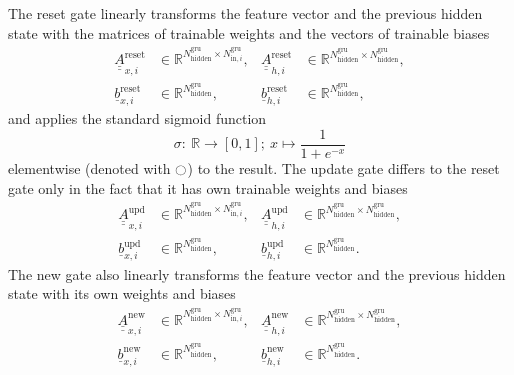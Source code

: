 The reset gate linearly transforms the feature vector and the previous hidden state
with the matrices of trainable weights and the vectors of trainable biases
\begin{align}
    \underline{\underline A}^\text{reset}_{x,i}
    &\in \mathbb{R}^{
        N^\text{gru}_{\text{hidden}}
        \times
        N^\text{gru}_{\text{in},i}
    }
    ,
    &\underline{\underline A}^\text{reset}_{h,i}
    &\in \mathbb{R}^{
        N^\text{gru}_{\text{hidden}}
        \times
        N^\text{gru}_{\text{hidden}}
    }
    ,
    \nonumber \\
    \underline{b}^\text{reset}_{x,i}
    &\in \mathbb{R}^{
        N^\text{gru}_{\text{hidden}}
    }
    ,
    &\underline{b}^\text{reset}_{h,i}
    &\in \mathbb{R}^{
        N^\text{gru}_{\text{hidden}}
    }
    ,
\end{align}
and applies the standard sigmoid function \cite{Han1995}
\begin{equation}
    \sigma
    :\ 
    \mathbb{R}
    \rightarrow
    \left[
        0,1
    \right]
    ;\ 
    x \mapsto \frac{1}{1 + e^{-x}}
\end{equation}
elementwise (denoted with $\fullmoon$) to the result.
The update gate differs to the reset gate only in the fact
that it has own trainable weights and biases
\begin{align}
    \underline{\underline A}^\text{upd}_{x,i}
    &\in \mathbb{R}^{
        N^\text{gru}_{\text{hidden}}
        \times
        N^\text{gru}_{\text{in},i}
    }
    ,
    &\underline{\underline A}^\text{upd}_{h,i}
    &\in \mathbb{R}^{
        N^\text{gru}_{\text{hidden}}
        \times
        N^\text{gru}_{\text{hidden}}
    }
    ,
    \nonumber \\
    \underline{b}^\text{upd}_{x,i}
    &\in \mathbb{R}^{
        N^\text{gru}_{\text{hidden}}
    }
    ,
    &\underline{b}^\text{upd}_{h,i}
    &\in \mathbb{R}^{
        N^\text{gru}_{\text{hidden}}
    }
    .
\end{align}
The new gate also linearly transforms the feature vector and the previous hidden state
with its own weights and biases
\begin{align}
    \underline{\underline A}^\text{new}_{x,i}
    &\in \mathbb{R}^{
        N^\text{gru}_{\text{hidden}}
        \times
        N^\text{gru}_{\text{in},i}
    }
    ,
    &\underline{\underline A}^\text{new}_{h,i}
    &\in \mathbb{R}^{
        N^\text{gru}_{\text{hidden}}
        \times
        N^\text{gru}_{\text{hidden}}
    }
    ,
    \nonumber \\
    \underline{b}^\text{new}_{x,i}
    &\in \mathbb{R}^{
        N^\text{gru}_{\text{hidden}}
    }
    ,
    &\underline{b}^\text{new}_{h,i}
    &\in \mathbb{R}^{
        N^\text{gru}_{\text{hidden}}
    }
    .
\end{align}
